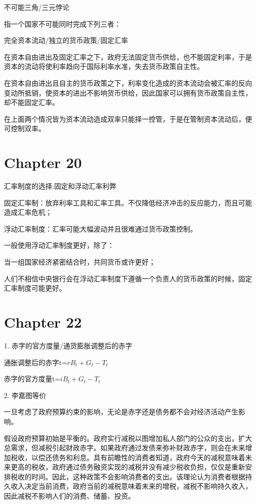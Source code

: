 \documentclass{article}
\begin{document}
不可能三角/三元悖论

指一个国家不可能同时完成下列三者：

完全资本流动/独立的货币政策/固定汇率

在资本自由进出及固定汇率之下，政府无法固定货币供给，也不能固定利率，于是资本的流动将使利率趋向于国际利率水准，失去货币政策自主性。

在资本自由进出且自主的货币政策之下，利率变化造成的资本流动会被汇率的反向变动所抵销，使资本的进出不影响货币供给，因此国家可以拥有货币政策自主性，却不能固定汇率。

在上面两个情况皆为资本流动造成双率只能择一控管，于是在管制资本流动后，便可控制双率。

\section{Chapter 20}

汇率制度的选择:固定和浮动汇率利弊

固定汇率制：放弃利率工具和汇率工具。不仅降低经济冲击的反应能力，而且可能造成汇率危机；

浮动汇率制度：汇率可能大幅波动并且很难通过货币政策控制。

一般使用浮动汇率制度更好，除了：

当一组国家经济紧密结合时，共同货币或许更好；

人们不相信中央银行会在浮动汇率制度下遵循一个负责人的货币政策的时候，固定汇率制度可能更好。

\section{Chapter 22}

1. 赤字的官方度量/通货膨胀调整后的赤字

通胀调整后的赤字t=$ rB_t+G_t-T_t $

赤字的官方度量t=$ i B_t+G_t-T_t $

\hspace*{\fill}

2. 李嘉图等价

一旦考虑了政府预算约束的影响，无论是赤字还是债务都不会对经济活动产生影响。

假设政府预算初始是平衡的。政府实行减税以图增加私人部门的公众的支出，扩大总需求，但减税引起财政赤字。如果政府通过发债来弥补财政赤字，则会在未来增加税收，以偿还债务和利息。具有前瞻性的消费者知道，政府今天的减税意味着未来更高的税收，政府通过债务融资实现的减税并没有减少税收负担，仅仅是重新安排税收的时间。因此，这种政策不会影响消费者的支出。该理论认为消费者根据持久收入决定当前消费，政府当前的减税意味着未来的增税，减税不影响持久收入，因此减税不影响人们的消费、储蓄、投资。
\end{document}
